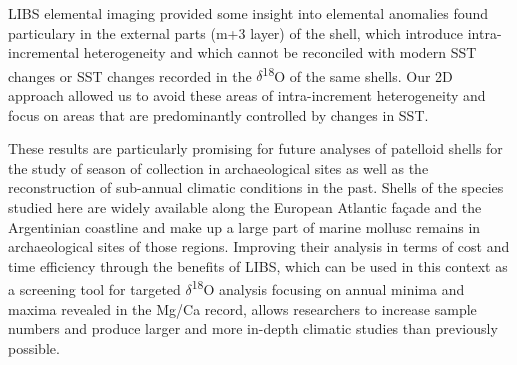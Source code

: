 \documentclass[
  authoryear,
  preprint,
  3p]{elsarticle}
\begin{document}
LIBS elemental imaging provided some insight into elemental anomalies
found particulary in the external parts (m+3 layer) of the shell, which
introduce intra-incremental heterogeneity and which cannot be reconciled
with modern SST changes or SST changes recorded in the
\(\delta\)\textsuperscript{18}O of the same shells. Our 2D approach
allowed us to avoid these areas of intra-increment heterogeneity and
focus on areas that are predominantly controlled by changes in SST.

These results are particularly promising for future analyses of
patelloid shells for the study of season of collection in archaeological
sites as well as the reconstruction of sub-annual climatic conditions in
the past. Shells of the species studied here are widely available along
the European Atlantic façade and the Argentinian coastline and make up a
large part of marine mollusc remains in archaeological sites of those
regions. Improving their analysis in terms of cost and time efficiency
through the benefits of LIBS, which can be used in this context as a
screening tool for targeted \(\delta\)\textsuperscript{18}O analysis
focusing on annual minima and maxima revealed in the Mg/Ca record,
allows researchers to increase sample numbers and produce larger and
more in-depth climatic studies than previously possible.


\renewcommand\refname{References}
  
\end{document}
